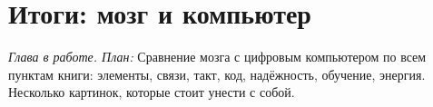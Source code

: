 \chapter{Итоги: мозг и компьютер}
\label{sec:summary}

\emph{Глава в работе. План:} Сравнение мозга с цифровым компьютером по всем пунктам книги: элементы, связи, такт, код, надёжность, обучение, энергия. Несколько картинок, которые стоит унести с собой.
